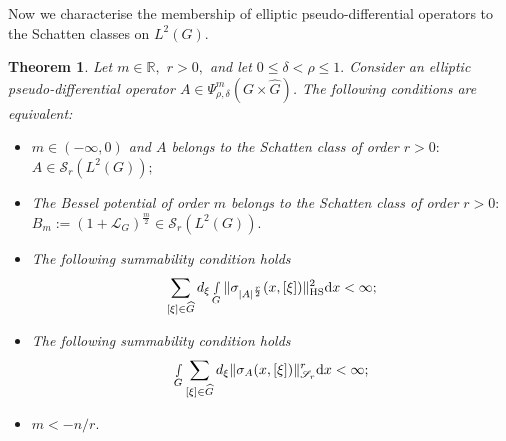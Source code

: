 \documentclass[12pt, reqno]{amsart}
\newtheorem{theorem}{Theorem}[section]
\theoremstyle{definition}
\theoremstyle{remark}
\numberwithin{equation}{section}
\begin{document}
Now we characterise the membership of elliptic pseudo-differential operators to the Schatten classes on $L^2(G).$
\begin{theorem}\label{Schatten:properties:}  Let $m\in \mathbb{R},$ $r>0, $ and let $0\leq \delta<\rho\leq 1.$ Consider an elliptic pseudo-differential operator $A\in \Psi^m_{\rho,\delta}(G\times \widehat{G})$. The following conditions are equivalent:
\begin{itemize}
    \item[(1)] $m\in (-\infty,0)$ and  $A$ belongs to the Schatten class of order $r>0:$ $A\in \mathscr{S}_r(L^2(G));$
    \item[(2)] The Bessel potential of order $m$ belongs to the Schatten class of order $r>0:$ $B_{m}:=(1+\mathcal{L}_G)^{\frac{m}{2}}\in \mathscr{S}_r(L^2(G)). $
    \item[(3)] The following summability condition holds
    \begin{equation}
        \sum_{[\xi]\in \widehat{G}}d_\xi\smallint\limits_G\|\sigma_{|A|^{\frac{r}{2}}}(x,[\xi])\|_{\textnormal{HS} }^2\textnormal{d}x<\infty;
    \end{equation}
    \item[(4)] The following summability condition holds
    \begin{equation}
        \smallint\limits_G\sum_{[\xi]\in \widehat{G}}d_\xi\|\sigma_{A}(x,[\xi])\|_{\mathscr{S}_r }^r\textnormal{d}x<\infty;
    \end{equation}
    \item[(5)] $m<-n/r.$
\end{itemize}
\end{theorem}
\end{document}
